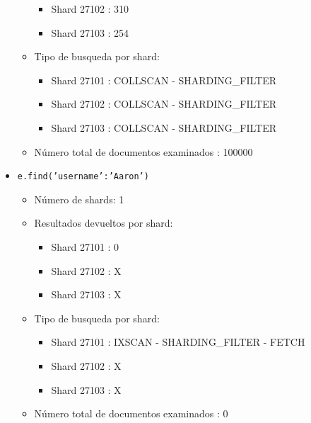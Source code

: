 \documentclass{article}
\begin{document}
\begin{itemize}
\begin{itemize}
\begin{itemize}
              \item Shard 27102 : 310
              \item Shard 27103 : 254
            \end{itemize}
          \item Tipo de busqueda por shard:
            \begin{itemize}
              \item Shard 27101 : COLLSCAN - SHARDING\_FILTER
              \item Shard 27102 : COLLSCAN - SHARDING\_FILTER
              \item Shard 27103 : COLLSCAN - SHARDING\_FILTER
            \end{itemize}
          \item Número total de documentos examinados : 100000
        \end{itemize}
      \item \texttt{e.find({'username':'Aaron'})}
        \begin{itemize}
          \item Número de shards: 1
          \item Resultados devueltos por shard:
            \begin{itemize}
              \item Shard 27101 : 0
              \item Shard 27102 : X
              \item Shard 27103 : X
            \end{itemize}
          \item Tipo de busqueda por shard:
            \begin{itemize}
              \item Shard 27101 : IXSCAN - SHARDING\_FILTER - FETCH
              \item Shard 27102 : X
              \item Shard 27103 : X
            \end{itemize}
          \item Número total de documentos examinados : 0
        \end{itemize}
    \end{itemize}
\end{document}
